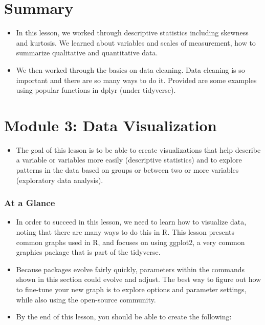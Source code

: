 \documentclass[
  letterpaper,
  DIV=11,
  numbers=noendperiod]{scrreprt}
\providecommand{\tightlist}{%
  \setlength{\itemsep}{0pt}\setlength{\parskip}{0pt}}\usepackage{longtable,booktabs,array}
\begin{document}

\chapter{Summary}\label{summary-2}

\begin{itemize}
\tightlist
\item
  In this lesson, we worked through descriptive statistics including
  skewness and kurtosis. We learned about variables and scales of
  measurement, how to summarize qualitative and quantitative data.
\item
  We then worked through the basics on data cleaning. Data cleaning is
  so important and there are so many ways to do it. Provided are some
  examples using popular functions in dplyr (under tidyverse).
\end{itemize}


\chapter{Module 3: Data
Visualization}\label{module-3-data-visualization}

\begin{itemize}
\tightlist
\item
  The goal of this lesson is to be able to create visualizations that
  help describe a variable or variables more easily (descriptive
  statistics) and to explore patterns in the data based on groups or
  between two or more variables (exploratory data analysis).
\end{itemize}

\subsection{At a Glance}\label{at-a-glance-2}

\begin{itemize}
\item
  In order to succeed in this lesson, we need to learn how to visualize
  data, noting that there are many ways to do this in R. This lesson
  presents common graphs used in R, and focuses on using ggplot2, a very
  common graphics package that is part of the tidyverse.
\item
  Because packages evolve fairly quickly, parameters within the commands
  shown in this section could evolve and adjust. The best way to figure
  out how to fine-tune your new graph is to explore options and
  parameter settings, while also using the open-source community.
\item
  By the end of this lesson, you should be able to create the following:
\end{itemize}
\end{document}
